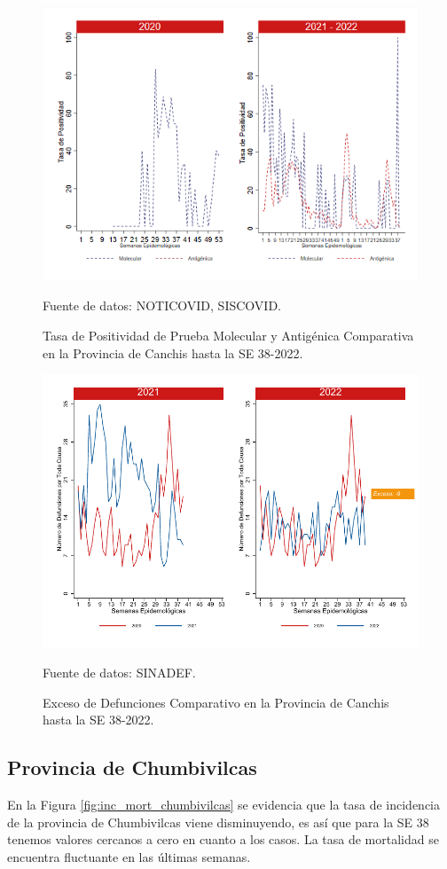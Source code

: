 \documentclass[12pt,a4paper,openany]{book}
\begin{document}
	\begin{figure}[h]
		\caption{Tasa de Positividad de Prueba Molecular y Antigénica Comparativa en la Provincia de Canchis hasta la SE 38-2022.}\label{fig:positividad_canchis}
		\begin{center}
			\includegraphics[width=0.7\linewidth]{../figuras/positividad_20_21_5.png}
		\end{center}
		{\footnotesize {Fuente de datos: NOTICOVID, SISCOVID.}}
	\end{figure}
	
	\begin{figure}[h]
		\caption{Exceso de Defunciones Comparativo en la Provincia de Canchis hasta la SE 38-2022.}\label{fig:exceso_canchis}
		\begin{center}
			\includegraphics[width=0.7\linewidth]{../figuras/exceso_5.pdf}
		\end{center}
		{\footnotesize {Fuente de datos: SINADEF.}}
	\end{figure}
	
	\clearpage
	
	\subsection*{Provincia de Chumbivilcas}
	\noindent En la Figura \ref{fig:inc_mort_chumbivilcas} se evidencia que la tasa de incidencia de la provincia de Chumbivilcas viene disminuyendo, es así que para la SE 38 tenemos valores cercanos a cero en cuanto a los casos. La tasa de mortalidad se encuentra fluctuante en las últimas semanas.
	
\end{document}
